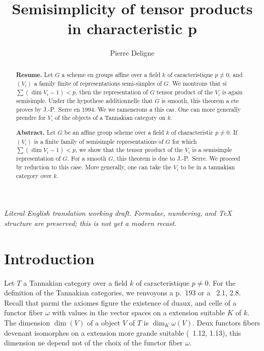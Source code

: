 \documentclass[11pt,a4paper]{article}
\theoremstyle{plain}
\theoremstyle{definition}
\begin{document}
\begin{center}\small\emph{Literal English translation working draft. Formulae, numbering, and TeX structure are preserved; this is not yet a modern recast.}\end{center}
\vspace{0.5em}


\title{Semisimplicity of tensor products in characteristic p}
\author{Pierre Deligne}
\date{}
\maketitle

\begin{abstract}
\noindent\textbf{Resume.}
Let $G$ a scheme en groups affine over a field $k$ of caracteristique $p \neq 0$, and $(V_i)$ a family finite of representations semi-simples of $G$. We montrons that si $\sum (\dim V_i - 1) < p$, then the representation of $G$ tensor product of the $V_i$ is again semisimple. Under the hypothese additionnelle that $G$ is smooth, this theorem a ete proves by J.-P.\ Serre en 1994. We we ramenerons a this cas. One can more generally prendre for $V_i$ of the objects of a Tannakian category on $k$.

\medskip\noindent\textbf{Abstract.}
Let $G$ be an affine group scheme over a field $k$ of characteristic $p \neq 0$. If $(V_i)$ is a finite family of semisimple representations of $G$ for which $\sum (\dim V_i - 1) < p$, we show that the tensor product of the $V_i$ is a semisimple representation of $G$. For a smooth $G$, this theorem is due to J.-P.\ Serre. We proceed by reduction to this case. More generally, one can take the $V_i$ to be in a tannakian category over $k$.
\end{abstract}

\section{Introduction}\label{sec:0}

Let $T$ a Tannakian category over a field $k$ of caracteristique $p \neq 0$. For the definition of the Tannakian categories, we renvoyons a \cite{Saavedra} p.~193 or a \cite{Deligne1990}~2.1, 2.8. Recall that parmi the axiomes figure the existence of duaux, and celle of a functor fiber $\omega$ with values in the vector spaces on a extension suitable $K$ of $k$. The dimension $\dim(V)$ of a object $V$ of $T$ is $\dim_K \omega(V)$. Deux functors fibers devenant isomorphes on a extension more grande suitable (\cite{Deligne1990}~1.12, 1.13), this dimension ne depend not of the choix of the functor fiber $\omega$.
\end{document}

